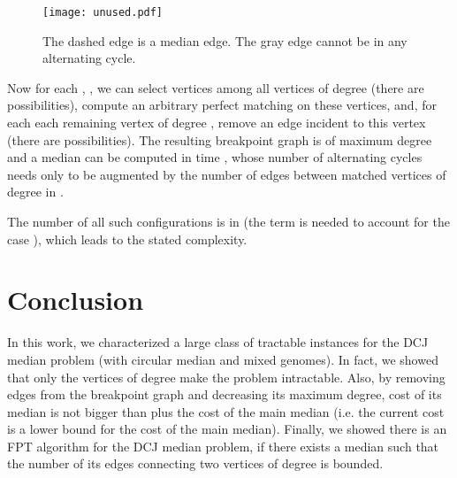 \documentclass[10pt]{llncs}
\begin{document}
\begin{figure} 
  \begin{center}
    \texttt{[image: unused.pdf]}
    \caption{The dashed edge is a median edge. The gray edge cannot be
      in any alternating cycle.}
    \label{3edge}
  \end{center}
\end{figure}

Now for each , , we can select  vertices
among all  vertices of degree  (there are 
possibilities), compute an arbitrary perfect matching on these 
vertices, and, for each each remaining vertex of degree , remove an
edge incident to this vertex (there are 
possibilities). The resulting breakpoint graph  is of maximum
degree  and a median can be computed in time , whose number
of alternating cycles needs only to be augmented by the number of
edges between matched vertices of degree  in . 

The number of all such configurations is in
 (the term  is needed to
account for the case ), which leads to the stated complexity.




























 










\section{Conclusion}

In this work, we characterized a large class of tractable instances
for the DCJ median problem (with circular median and mixed
genomes). In fact, we showed that only the vertices of degree  make
the problem intractable. Also, by removing  edges from the
breakpoint graph and decreasing its maximum degree, cost of its median
is not bigger than  plus the cost of the main median (i.e. the
current cost  is a lower bound for the cost of the main median).
Finally, we showed there is an FPT algorithm for the DCJ median
problem, if there exists a median such that the number of its edges
connecting two vertices of degree  is bounded.
\end{document}
